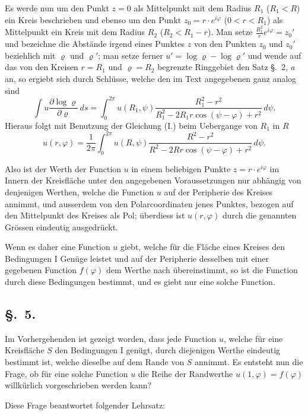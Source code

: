 \documentclass{article}
\begin{document}
Es werde nun um den Punkt $z = 0$ als Mittelpunkt mit dem Radius $R_1$ ($R_1 < R$) ein Kreis beschrieben und ebenso um den Punkt $z_0 = r \cdot e^{i\varphi}$ ($0 < r < R_1$) als Mittelpunkt ein Kreis mit dem Radius $R_2$ ($R_2 < R_1 - r$). Man setze $\frac{R_1^2}{r} e^{i\varphi} = z_0'$ und bezeichne die Abstände irgend eines Punktes $z$ von den Punkten $z_0$ und $z_0'$ beziehlich mit $\varrho$ und $\varrho'$; man setze ferner $u' = \log \varrho - \log \varrho'$ und wende auf das von den Kreisen $r = R_1$ und $\varrho = R_2$ begrenzte Ringgebiet den Satz §.~2, \emph{a} an, so ergiebt sich durch Schlüsse, welche den im Text angegebenen ganz analog sind
\[
\int u \frac{\partial\log \varrho}{\partial \varrho}\,ds = \int_0^{2\pi} u(R_1, \psi) \frac{R_1^2 - r^2}{R_1^2 - 2R_1 r \cos(\psi - \varphi) + r^2}\,d\psi.
\]
Hieraus folgt mit Benutzung der Gleichung (I.) beim Uebergange von $R_1$ in $R$
\[
\tag{II.} u(r, \varphi) = \frac{1}{2\pi} \int_0^{2\pi} u(R, \psi) \frac{R^2 - r^2}{R^2 - 2Rr \cos(\psi - \varphi) + r^2}\,d\psi.
\]

Also ist der Werth der Function $u$ in einem beliebigen Punkte $z = r \cdot e^{i\varphi}$ im Innern der Kreisfläche unter den angegebenen Voraussetzungen nur abhängig von denjenigen Werthen, welche die Function $u$ auf der Peripherie des Kreises annimmt, und ausserdem von den Polarcoordinaten jenes Punktes, bezogen auf den Mittelpunkt des Kreises als Pol; überdiess ist $u(r, \varphi)$ durch die genannten Grössen eindeutig ausgedrückt.

Wenn es daher eine Function $u$ giebt, welche für die Fläche eines Kreises den Bedingungen I Genüge leistet und auf der Peripherie desselben mit einer gegebenen Function $f(\varphi)$ dem Werthe nach übereinstimmt, so ist die Function durch diese Bedingungen bestimmt, und es giebt nur eine solche Function.

\subsection*{§.~5.}

Im Vorhergehenden ist gezeigt worden, dass jede Function $u$, welche für eine Kreisfläche $S$ den Bedingungen I genügt, durch diejenigen Werthe eindeutig bestimmt ist, welche dieselbe auf dem Rande von $S$ annimmt. Es entsteht nun die Frage, ob für eine solche Function $u$ die Reihe der Randwerthe $u(1, \varphi) = f(\varphi)$ willkürlich vorgeschrieben werden kann?

Diese Frage beantwortet folgender Lehrsatz:
\end{document}
